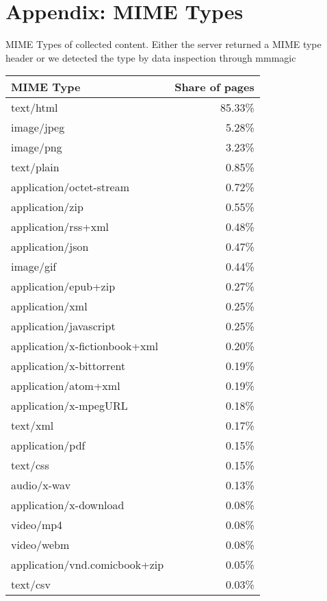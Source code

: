 %
%
\section{Appendix: MIME Types}
\label{appendix:A}
MIME Types of collected content. Either the server returned a MIME type header or we detected the type by data inspection through mmmagic\cite{mscdex}
\begin{center}
\label{table:mime types}
\begin{supertabular}[H]{l|r}
    \textbf{MIME Type} & \textbf{Share of pages}\\
	\hline
	\hline
	text/html			&	85.33\% \\
	\hline
	image/jpeg			&	5.28\% \\
	\hline
	image/png			&	3.23\% \\
	\hline
	text/plain			&	0.85\% \\
	\hline
	application/octet-stream		&	0.72\% \\
	\hline
	application/zip		&	0.55\% \\
	\hline
	application/rss+xml	&	0.48\% \\
	\hline
	application/json	&	0.47\% \\
	\hline
	image/gif			&	0.44\% \\
	\hline
	application/epub+zip			&	0.27\% \\
	\hline
	application/xml		&	0.25\% \\
	\hline
	application/javascript			&	0.25\% \\
	\hline
	application/x-fictionbook+xml	&	0.20\% \\
	\hline
	application/x-bittorrent		&	0.19\% \\
	\hline
	application/atom+xml			&	0.19\% \\
	\hline
	application/x-mpegURL			&	0.18\% \\
	\hline
	text/xml			&	0.17\% \\
	\hline
	application/pdf		&	0.15\% \\
	\hline
	text/css			&	0.15\% \\
	\hline
	audio/x-wav			&	0.13\% \\
	\hline
	application/x-download			&	0.08\% \\
	\hline
	video/mp4			&	0.08\% \\
	\hline
	video/webm			&	0.08\% \\
	\hline
	application/vnd.comicbook+zip	&	0.05\% \\
	\hline
	text/csv			&	0.03\% \\

\end{supertabular}
\end{center}
